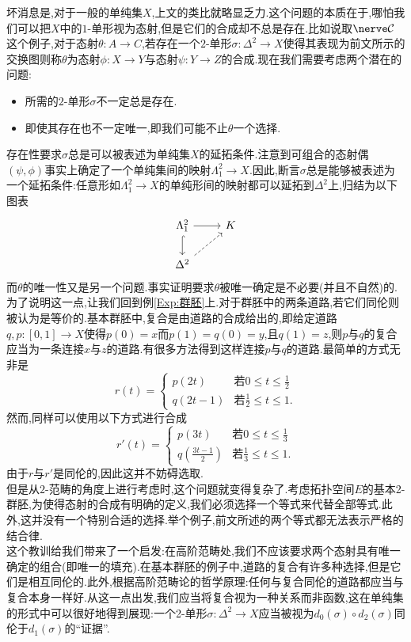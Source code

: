 坏消息是,对于一般的单纯集$X$,上文的类比就略显乏力.这个问题的本质在于,哪怕我们可以把$X$中的$1$-单形视为态射,但是它们的合成却不总是存在.比如说取$\nerve \mathcal{C}$这个例子,对于态射$\theta : A\to C$,若存在一个$2$-单形$\sigma : \Delta^2 \to X$使得其表现为前文所示的交换图则称$\theta$为态射$\phi : X \to Y$与态射$\psi :Y \to Z$的合成.现在我们需要考虑两个潜在的问题:
\begin{itemize}
    \item 所需的$2$-单形$\sigma$不一定总是存在.
    \item 即使其存在也不一定唯一,即我们可能不止$\theta$一个选择.
\end{itemize}
存在性要求$\sigma$总是可以被表述为单纯集$X$的延拓条件.注意到可组合的态射偶$(\psi ,\phi)$事实上确定了一个单纯集间的映射$\Lambda_1^2 \to X$.因此,断言$\sigma$总是能够被表述为一个延拓条件:任意形如$\Lambda_1^2 \to X$的单纯形间的映射都可以延拓到$\Delta^2$上,归结为以下图表
\[\begin{tikzcd}
	{\Lambda_1^2} & K \\
	{\Delta^2}
	\arrow[from=1-1, to=1-2]
	\arrow[hook, from=1-1, to=2-1]
	\arrow[dashed, from=2-1, to=1-2]
\end{tikzcd}\]
而$\theta$的唯一性又是另一个问题.事实证明要求$\theta$被唯一确定是不必要(并且不自然)的.为了说明这一点,让我们回到例\ref{Exp:群胚}上.对于群胚中的两条道路,若它们同伦则被认为是等价的.基本群胚中,复合是由道路的合成给出的,即给定道路$q,p : [0,1] \to X$使得$p(0) = x$而$p(1)=q(0) = y$,且$q(1) = z$,则$p$与$q$的复合应当为一条连接$x$与$z$的道路.有很多方法得到这样连接$p$与$q$的道路.最简单的方式无非是
\[
r(t) = \left\{\begin{array}{cc}
     p(2t)&\text{若}0\leq t \leq \frac{1}{2}  \\
     q(2t-1)&\text{若}\frac{1}{2}\leq t\leq 1. 
\end{array}\right.
\]
然而,同样可以使用以下方式进行合成
\[
r'(t) = \left\{\begin{array}{cc}
   p(3t)  & \text{若} 0\leq t \leq \frac{1}{3} \\
   q(\frac{3t-1}{2})& \text{若} \frac{1}{3}\leq t\leq 1.
\end{array}\right.
\]
由于$r$与$r'$是同伦的,因此这并不妨碍选取.\\
但是从$2$-范畴的角度上进行考虑时,这个问题就变得复杂了.考虑拓扑空间$E$的基本2-群胚,为使得态射的合成有明确的定义,我们必须选择一个等式来代替全部等式.此外,这并没有一个特别合适的选择.举个例子,前文所述的两个等式都无法表示严格的结合律.\\
这个教训给我们带来了一个启发:在高阶范畴处,我们不应该要求两个态射具有唯一确定的组合(即唯一的填充).在基本群胚的例子中,道路的复合有许多种选择,但是它们是相互同伦的.此外,根据高阶范畴论的哲学原理:任何与复合同伦的道路都应当与复合本身一样好.从这一点出发,我们应当将复合视为一种关系而非函数,这在单纯集的形式中可以很好地得到展现:一个2-单形$\sigma :\Delta^2 \to X$应当被视为$d_0(\sigma) \circ d_2(\sigma)$同伦于$d_1(\sigma)$的``证据''.\\

